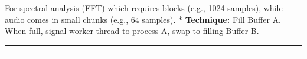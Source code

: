 For spectral analysis (FFT) which requires blocks (e.g., 1024 samples),
while audio comes in small chunks (e.g., 64 samples). *
\textbf{Technique:} Fill Buffer A. When full, signal worker thread to
process A, swap to filling Buffer B.

\begin{center}\rule{0.5\linewidth}{0.5pt}\end{center}

\begin{center}\rule{0.5\linewidth}{0.5pt}\end{center}
